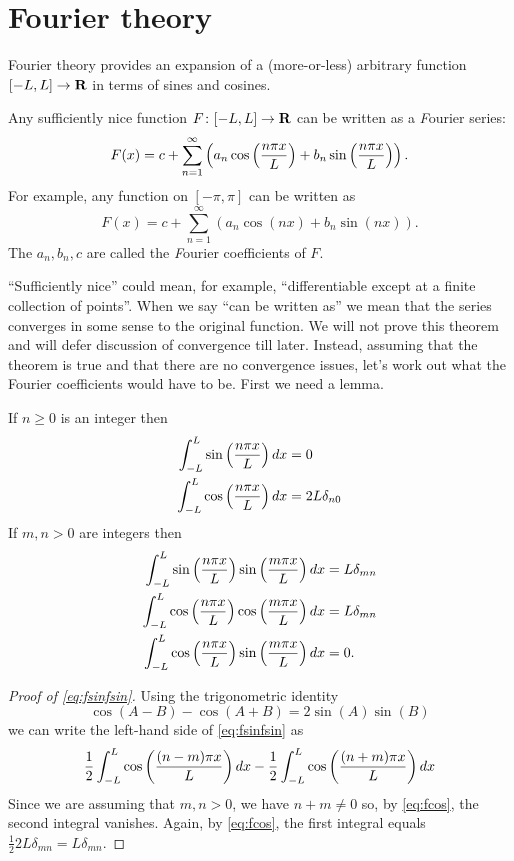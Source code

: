 \section{Fourier theory}

Fourier theory provides an expansion of a (more-or-less) arbitrary function $[-L,L]\to\mathbf{R}$ in terms of sines and cosines.

\begin{thm}
Any sufficiently nice function $F\colon [-L,L]\to\mathbf{R}$ can be written as a {\emph Fourier series}:
\[F(x)=c+\sum_{n=1}^{\infty}\left(a_n\cos\left(\frac{n \pi x}{L}\right)+b_n\sin\left(\frac{n \pi x}{L}\right)\right).\]
For example, any function on $[-\pi,\pi]$ can be written as
\[F(x)=c+\sum_{n=1}^{\infty}\left(a_n\cos(nx)+b_n\sin(nx)\right).\]
The $a_n,b_n,c$ are called the {\emph Fourier coefficients} of $F$.
\end{thm}

``Sufficiently nice'' could mean, for example, ``differentiable except at a finite collection of points''. When we say ``can be written as'' we mean that the series converges in some sense to the original function. We will not prove this theorem and will defer discussion of convergence till later. Instead, assuming that the theorem is true and that there are no convergence issues, let's work out what the Fourier coefficients would have to be. First we need a lemma.

\begin{lma}
If $n\geq 0$ is an integer then
\begin{align}
\label{eq:fsin}
\int_{-L}^L\sin\left(\frac{n \pi x}{L}\right)dx        &= 0\\
\label{eq:fcos}
\int_{-L}^L\cos\left(\frac{n \pi x}{L}\right)dx        &= 2L\delta_{n0}
\end{align}
If $m,n>0$ are integers then
\begin{align}
\label{eq:fsinfsin}
\int_{-L}^L\sin\left(\frac{n \pi x}{L}\right)\sin\left(\frac{m \pi x}{L}\right)dx&= L\delta_{mn}\\
\label{eq:fcosfcos}
\int_{-L}^L\cos\left(\frac{n \pi x}{L}\right)\cos\left(\frac{m \pi x}{L}\right)dx&= L\delta_{mn}\\
\label{eq:fcosfsin}
\int_{-L}^L\cos\left(\frac{n \pi x}{L}\right)\sin\left(\frac{m \pi x}{L}\right)dx&= 0.
\end{align}
\end{lma}
\begin{proof}[Proof of \eqref{eq:fsinfsin}]
Using the trigonometric identity
\[\cos(A-B)-\cos(A+B)=2\sin(A)\sin(B)\]
we can write the left-hand side of \eqref{eq:fsinfsin} as
\[
\frac{1}{2}\int_{-L}^L\cos\left(\frac{(n-m) \pi x}{L}\right)dx-\frac{1}{2}\int_{-L}^L\cos\left(\frac{(n+m) \pi x}{L}\right)dx
\]
Since we are assuming that $m,n>0$, we have $n+m\neq 0$ so, by \eqref{eq:fcos}, the second integral vanishes. Again, by \eqref{eq:fcos}, the first integral equals $\frac{1}{2}2L\delta_{mn}=L\delta_{mn}$.
\end{proof}

